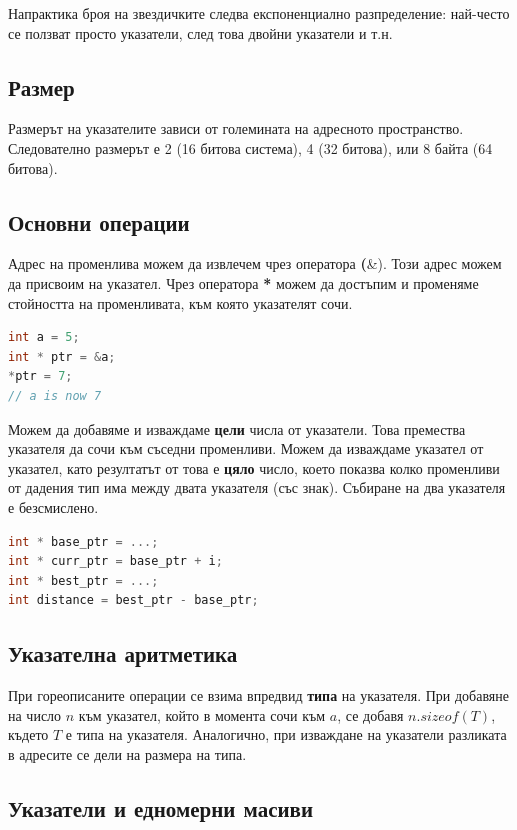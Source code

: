 \documentclass[fleqn,12pt]{article}
\begin{document}
Напрактика броя на звездичките следва експоненциално разпределение: най-често се ползват просто указатели, след това двойни указатели и т.н.

\subsection{Размер}
Размерът на указателите зависи от големината на адресното пространство. Следователно размерът е 2 (16 битова система), 4 (32 битова), 
или 8 байта (64 битова).

\subsection{Основни операции}
Адрес на променлива можем да извлечем чрез оператора \textbf(\&). Този адрес можем да присвоим на указател. 
Чрез оператора \textbf{*} можем да достъпим и променяме стойността на променливата, към която указателят сочи.
\begin{lstlisting}[language=C++, caption=Pointer example 2]
int a = 5;
int * ptr = &a;
*ptr = 7;
// a is now 7
\end{lstlisting}

Можем да добавяме и изваждаме \textbf{цели} числа от указатели. Това премества указателя да сочи към съседни променливи.
Можем да изваждаме указател от указател, като резултатът от това е \textbf{цяло} число, което показва колко променливи от 
дадения тип има между двата указателя (със знак). Събиране на два указателя е безсмислено.

\begin{lstlisting}[language=C++, caption=Pointer example 3]
int * base_ptr = ...;
int * curr_ptr = base_ptr + i;
int * best_ptr = ...;
int distance = best_ptr - base_ptr;
\end{lstlisting}

\subsection{Указателна аритметика}
При гореописаните операции се взима впредвид \textbf{типа} на указателя. При добавяне на число $n$ към указател, който в момента сочи към $a$, се 
добавя $n . sizeof(T)$, където $T$ е типа на указателя. Аналогично, при изваждане на указатели разликата в адресите се дели на размера на типа.

\subsection{Указатели и едномерни масиви}
\end{document}
